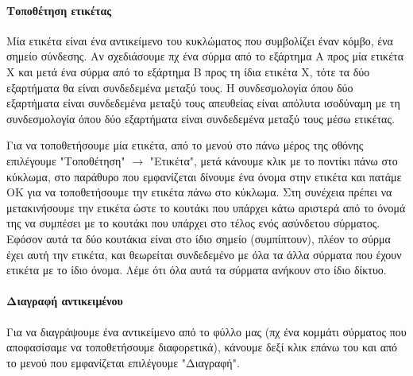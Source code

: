 \documentclass[a4paper]{article}
\begin{document}
\paragraph{Τοποθέτηση ετικέτας}
Μία ετικέτα είναι ένα αντικείμενο του κυκλώματος που συμβολίζει έναν κόμβο, ένα σημείο σύνδεσης. Αν σχεδιάσουμε πχ ένα σύρμα από το εξάρτημα Α προς μία ετικέτα Χ και μετά ένα σύρμα από το εξάρτημα Β προς τη ίδια ετικέτα Χ, τότε τα δύο εξαρτήματα θα είναι συνδεδεμένα μεταξύ τους. Η συνδεσμολογία όπου δύο εξαρτήματα είναι συνδεδεμένα μεταξύ τους απευθείας είναι απόλυτα ισοδύναμη με τη συνδεσμολογία όπου δύο εξαρτήματα είναι συνδεδεμένα μεταξύ τους μέσω ετικέτας.

Για να τοποθετήσουμε μία ετικέτα, από το μενού στο πάνω μέρος της οθόνης επιλέγουμε "Τοποθέτηση" $\rightarrow$ "Ετικέτα", μετά κάνουμε κλικ με το ποντίκι πάνω στο κύκλωμα, στο παράθυρο που εμφανίζεται δίνουμε ένα όνομα στην ετικέτα και πατάμε ΟΚ για να τοποθετήσουμε την ετικέτα πάνω στο κύκλωμα. Στη συνέχεια πρέπει να μετακινήσουμε την ετικέτα ώστε το κουτάκι που υπάρχει κάτω αριστερά από το όνομά της να συμπέσει με το κουτάκι που υπάρχει στο τέλος ενός ασύνδετου σύρματος. Εφόσον αυτά τα δύο κουτάκια είναι στο ίδιο σημείο (συμπίπτουν), πλέον το σύρμα έχει αυτή την ετικέτα, και θεωρείται συνδεδεμένο με όλα τα άλλα σύρματα που έχουν ετικέτα με το ίδιο όνομα. Λέμε ότι όλα αυτά τα σύρματα ανήκουν στο ίδιο δίκτυο.

\begin{figure}
  \begin{center}
    \label{fig:kicad-main}
  \end{center}
\end{figure}

\begin{figure}
  \begin{center}
    \label{fig:kicad-main}
  \end{center}
\end{figure}

\paragraph{Διαγραφή αντικειμένου}
Για να διαγράψουμε ένα αντικείμενο από το φύλλο μας (πχ ένα κομμάτι σύρματος που αποφασίσαμε να τοποθετήσουμε διαφορετικά), κάνουμε δεξί κλικ επάνω του και από το μενού που εμφανίζεται επιλέγουμε "Διαγραφή".
\end{document}

